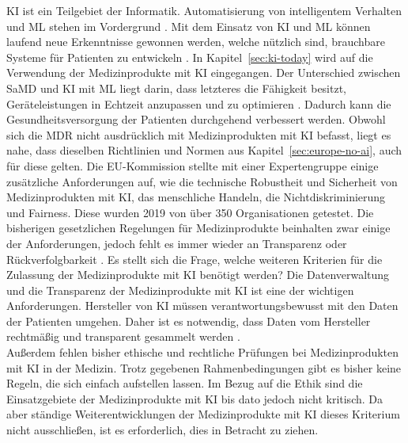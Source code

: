 KI ist ein Teilgebiet der Informatik.
Automatisierung von intelligentem Verhalten und ML stehen im Vordergrund \cite{AI_in_EU}.
Mit dem Einsatz von KI und ML können laufend neue Erkenntnisse gewonnen werden,
welche nützlich sind, brauchbare Systeme für Patienten zu entwickeln \cite{AI_in_EU}.
In Kapitel~\ref{sec:ki-today} wird auf die Verwendung der Medizinprodukte mit KI eingegangen.
Der Unterschied zwischen SaMD und KI mit ML liegt darin, dass letzteres die Fähigkeit besitzt, 
Geräteleistungen in Echtzeit anzupassen und zu optimieren \cite{AI_in_EU}.
Dadurch kann die Gesundheitsversorgung der Patienten durchgehend verbessert werden. 
Obwohl sich die MDR nicht ausdrücklich mit Medizinprodukten mit KI befasst, 
liegt es nahe, dass dieselben Richtlinien und Normen aus Kapitel~\ref{sec:europe-no-ai},
auch für diese gelten. 
Die EU-Kommission stellte mit einer Expertengruppe einige zusätzliche Anforderungen auf, wie die technische Robustheit und Sicherheit von Medizinprodukten mit KI, das menschliche Handeln, 
die Nichtdiskriminierung und Fairness. 
Diese wurden 2019 von über 350 Organisationen getestet. 
Die bisherigen gesetzlichen Regelungen für Medizinprodukte beinhalten zwar einige der Anforderungen, 
jedoch fehlt es immer wieder an Transparenz oder Rückverfolgbarkeit \cite{whitepaper}.
Es stellt sich die Frage, welche weiteren Kriterien für die Zulassung der Medizinprodukte mit KI benötigt werden?
Die Datenverwaltung und die Transparenz der Medizinprodukte mit KI ist eine der wichtigen Anforderungen.
Hersteller von KI müssen verantwortungsbewusst mit den Daten der Patienten umgehen. 
Daher ist es notwendig, dass Daten vom Hersteller rechtmäßig und transparent gesammelt werden \cite{Lessons_Learned_about_ai}.\\
Außerdem fehlen bisher ethische und rechtliche Prüfungen bei Medizinprodukten mit KI in der Medizin. 
Trotz gegebenen Rahmenbedingungen gibt es bisher keine Regeln, die sich einfach aufstellen lassen.
Im Bezug auf die Ethik sind die Einsatzgebiete der Medizinprodukte mit KI bis dato jedoch nicht kritisch.
Da aber ständige Weiterentwicklungen der Medizinprodukte mit KI dieses Kriterium nicht ausschließen, ist es erforderlich, dies in Betracht zu ziehen.